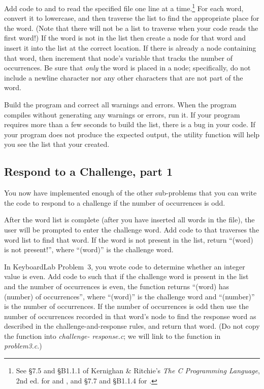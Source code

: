 

Add code to  and  to read the
specified file one line at a time.\footnote{See \S7.5 and \S{}B1.1.1 of
Kernighan \& Ritchie's \textit{The C Programming Language}, 2nd ed. for
 and , and \S7.7 and \S{}B1.1.4 for
.} For each word, convert it to lowercase, and then traverse
the list to find the appropriate place for the word. (Note that there will not
be a list to traverse when your code reads the first word!) If the word is not
in the list then create a node for that word and insert it into the list at the
correct location. If there is already a node containing that word, then
increment that node's variable that tracks the number of occurrences. Be sure
that \textit{only} the word is placed in a node; specifically, do not include a
newline character nor any other characters that are not part of the word.

Build the program and correct all warnings and errors. When the program
compiles without generating any warnings or errors, run it. If your program
requires more than a few seconds to build the list, there is a bug in your
code. If your program does not produce the expected output, the
 utility function will help you see the list that your
created.

\subsection{Respond to a Challenge, part 1}

You now have implemented enough of the other sub-problems that you can write the
code to respond to a challenge if the number of occurrences is odd.



After the word list is complete (after you have inserted all words in the
file), the user will be prompted to enter the challenge word. Add code to
 that traverses the word list to find that word. If the word
is not present in the list, return ``(word) is not present!'', where ``(word)''
is the challenge word.

In KeyboardLab Problem~3, you wrote code to determine whether an integer value
is even. Add code to  such that if the challenge word is
present in the list and the number of occurrences is even, the function returns
``(word) has (number) of occurrences'', where ``(word)'' is the challenge word
and ``(number)'' is the number of occurrences. If the number of occurrences is
odd then use the number of occurrences recorded in that word's node to find the
response word as described in the challenge-and-response rules, and return that
word. (Do not copy the  function into \textit{challenge-
response.c}; we will link to the function in \textit{problem3.c}.)

